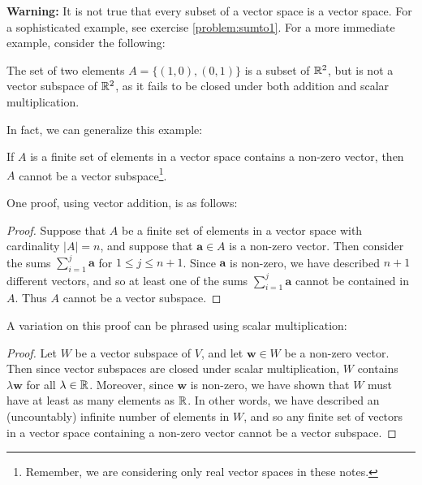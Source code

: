     
    \textbf{Warning:} It is not true that every subset of a vector space is a vector space.  For a sophisticated example, see  exercise \ref{problem:sumto1}.  For a more immediate example, consider the following:
    
    \begin{example}
    The set of two elements $A = \{(1,0), (0,1)\}$ is a subset of $\mathbb{R}^2$, but is not a vector subspace of $\mathbb{R}^2$, as it fails to be closed under both addition and scalar multiplication.
    \end{example}
    
    In fact, we can generalize this example:
    
    \begin{example}
    \vspace{-1em}
    \begin{proposition}
    If $A$ is a finite set of elements in a vector space contains a non-zero vector, then $A$ cannot be a vector subspace\footnote{Remember, we are considering only real vector spaces in these notes.}.  
    \end{proposition}
    \end{example}


    One proof, using vector addition, is as follows:  
    
    \begin{proof}Suppose that $A$ be a finite set of elements in a vector space with cardinality $|A|=n$, and suppose that $\bm{a} \in A$ is a non-zero vector.  Then consider the sums $\sum_{i=1}^j\bm{a}$ for $1 \leq j \leq n+1$.  Since $\bm{a}$ is non-zero, we have described $n+1$ different vectors, and so at least one of the sums $\sum_{i=1}^j\bm{a}$ cannot be contained in $A$.  Thus $A$ cannot be a vector subspace.  
    \end{proof}

    
    A variation on this proof can be phrased using scalar multiplication: 

        \begin{proof}
    Let $W$ be a vector subspace of $V$, and let $\bm{w} \in W$ be a non-zero vector.  Then since vector subspaces are closed under scalar multiplication, $W$ contains $\lambda \bm{w}$ for all $\lambda \in \mathbb{R}$.  Moreover, since $\bm{w}$ is non-zero, we have shown that $W$ must have at least as many elements as $\mathbb{R}$.  In other words, we have described an (uncountably) infinite number of elements in $W$, and so any finite set of vectors in a vector space containing a non-zero vector cannot be a vector subspace.
    \end{proof}
    
